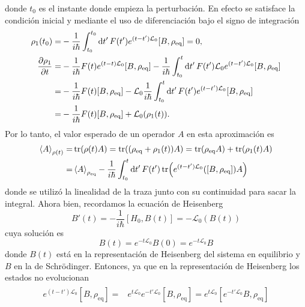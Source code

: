 \documentclass{article}
\begin{document}
\begin{enumerate}
\begin{equation}
\end{equation}
donde $t_0$ es el instante donde empieza la perturbación. En efecto se satisface la condición inicial y mediante el uso de diferenciación bajo el signo de integración
\begin{align}
\begin{split}
\rho_1(t_0)=&-\frac{1}{i\hbar}\int_{t_0}^{t_0}\dd{t'}F(t')e^{(t-t')\mathcal{L}_0}[B,\rho_{\text{eq}}]=0,\\
\pdv{\rho_1}{t}(t)=&-\frac{1}{i\hbar}F(t)e^{(t-t)\mathcal{L}_0}[B,\rho_{\text{eq}}]-\frac{1}{i\hbar}\int_{t_0}^t\dd{t'}F(t')\mathcal{L}_0e^{(t-t')\mathcal{L}_0}[B,\rho_{\text{eq}}]\\
=&-\frac{1}{i\hbar}F(t)[B,\rho_{\text{eq}}]-\mathcal{L}_0\frac{1}{i\hbar}\int_{t_0}^t\dd{t'}F(t')e^{(t-t')\mathcal{L}_0}[B,\rho_{\text{eq}}]\\
=&-\frac{1}{i\hbar}F(t)[B,\rho_{\text{eq}}]+\mathcal{L}_0(\rho_1(t)).
\end{split}
\end{align}
Por lo tanto, el valor esperado de un operador $A$ en esta aproximación es
\begin{align}
\begin{split}
\ev{A}_{\rho(t)}=&\tr(\rho(t)A)=\tr((\rho_\text{eq}+\rho_1(t))A)=\tr(\rho_\text{eq}A)+\tr(\rho_1(t)A)\\
=&\ev{A}_{\rho_\text{eq}}-\frac{1}{i\hbar}\int_{t_0}^t\dd{t'}F(t')\tr(e^{(t-t')\mathcal{L}_0}([B,\rho_{\text{eq}}])A)
\end{split}
\end{align}
donde se utilizó la linealidad de la traza junto con su continuidad para sacar la integral. Ahora bien, recordamos la ecuación de Heisenberg
\begin{equation}
B'(t)=-\frac{1}{i\hbar}[H_0,B(t)]=-\mathcal{L}_0(B(t))
\end{equation}
cuya solución es 
\begin{equation}\label{ec:evolucion_temporal}
B(t)=e^{-t\mathcal{L}_0}B(0)=e^{-t\mathcal{L}_0}B
\end{equation}
donde $B(t)$ está en la representación de Heisenberg del sistema en equilibrio y $B$ en la de Schrödinger. Entonces, ya que en la representación de Heisenberg los estados no evolucionan
\begin{align}
\begin{split}
e^{(t-t')\mathcal{L}_0}[B,\rho_{\text{eq}}]=&e^{t\mathcal{L}_0}e^{-t'\mathcal{L}_0}[B,\rho_{\text{eq}}]=e^{t\mathcal{L}_0}[e^{-t'\mathcal{L}_0}B,\rho_{\text{eq}}]\\

\end{split}
\end{align}
\end{enumerate}
\end{document}
